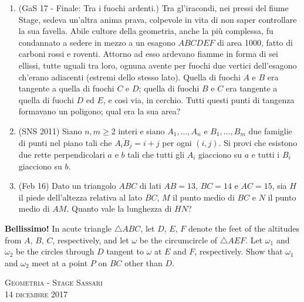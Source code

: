 \documentclass[a4paper]{article}
\theoremstyle{remark}
\theoremstyle{definition}
\begin{document}
\begin{enumerate}
\item (GaS 17 - Finale: Tra i fuochi ardenti.) 
Tra gl’iracondi, nei pressi del fiume Stage, sedeva un’altra anima prava, colpevole in vita di non saper controllare la sua
favella. Abile cultore della geometria, anche la più complessa, fu condannato a sedere in mezzo a un esagono $ ABCDEF $
di area 1000, fatto di carboni rossi e roventi. Attorno ad esso ardevano fiamme in forma di sei ellissi, tutte uguali tra loro,
ognuna avente per fuochi due vertici dell’esagono ch’erano adiacenti (estremi dello stesso lato). Quella di fuochi $ A $ e $ B $
era tangente a quella di fuochi $ C $ e $ D $; quella di fuochi $ B $ e $ C $ era tangente a quella di fuochi $ D $ ed $ E $, e così via, in
cerchio. Tutti questi punti di tangenza formavano un poligono; qual era la sua area?

\item (SNS 2011)
Siano $ n, m \geq 2 $ interi e siano $ A_1 , \dots, A_n $ e $ B_1 , \dots , B_m $ due famiglie di punti nel piano tali che $ \overline{A_iB_j} = i + j $ per ogni $ (i, j) $. Si provi che esistono due rette perpendicolari $ a $ e $ b $ tali che tutti gli $ A_i $ giacciono su $ a $ e tutti i $ B_i $ giacciono su $ b $.

\item (Feb 16) Dato un triangolo $ ABC $ di lati $ AB = 13 $, $ BC = 14 $ e $ AC = 15 $, sia $ H $ il piede dell’altezza relativa al lato $ BC $, $ M $ il punto medio di $ BC $ e $ N $ il punto medio di $ AM $. Quanto vale la lunghezza di $ HN $?

\end{enumerate}

\textbf{Bellissimo!} In acute triangle $ \triangle ABC $, let $ D,\, E,\, F $ denote the feet of the altitudes from
$ A,\, B,\, C $, respectively, and let $ \omega $ be the circumcircle of $\triangle AEF $. Let $ \omega_1 $ and $ \omega_2 $ be the circles through $ D $ tangent to $ \omega $ at $ E $ and $ F $, respectively. Show that $ \omega_1 $ and $ \omega_2 $ meet at a point $ P $ on $ BC $ other than $ D $.


\begin{center}
	\vspace*{0,5 cm}
	{\Huge \textsc{Geometria - Stage Sassari}} \\
	\vspace{0,5 cm}
	\textsc{\Author} \hspace{1cm} \textsc{14 dicembre 2017}
	\thispagestyle{empty}
	\vspace{0,7 cm}
\end{center}
\normalsize
\end{document}
